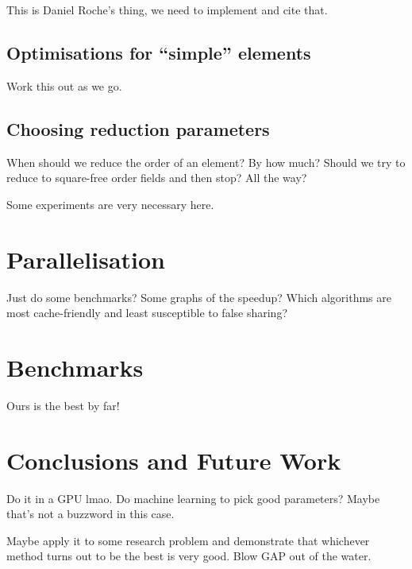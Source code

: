\documentclass{article}
\begin{document}
This is Daniel Roche's thing, we need to implement and cite that.

\subsection{Optimisations for ``simple'' elements}

Work this out as we go.

\subsection{Choosing reduction parameters}

When should we reduce the order of an element? By how much? Should we
try to reduce to square-free order fields and then stop? All the way?

Some experiments are very necessary here.

\section{Parallelisation}

Just do some benchmarks? Some graphs of the speedup? Which algorithms
are most cache-friendly and least susceptible to false sharing?

\section{Benchmarks}

Ours is the best by far!

\section{Conclusions and Future Work}

Do it in a GPU lmao. Do machine learning to pick good parameters?
Maybe that's not a buzzword in this case.

Maybe apply it to some research problem and demonstrate that whichever
method turns out to be the best is very good. Blow GAP out of the
water.
\end{document}

